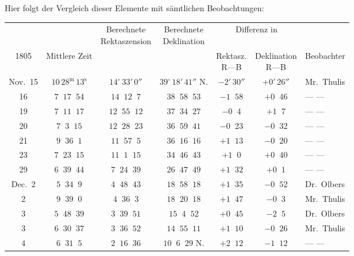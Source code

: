 \par\indent Hier folgt der Vergleich dieser Elemente mit sämtlichen Beobachtungen:



\begin{center}\begingroup
\fontsize{8}{10}\selectfont
\setlength{\tabcolsep}{2pt}\renewcommand{\arraystretch}{1.12}
\begin{tabular}{|c|c|c|c|c|c|l|}
\hline
& & \shortstack{Berechnete\\Rektaszension} & \shortstack{Berechnete\\Deklination} & \multicolumn{2}{c|}{Differenz in} & \\
1805 & Mittlere Zeit & & & \shortstack{Rektasz.\\R---B} & \shortstack{Deklination\\R---B} & Beobachter \\
\hline
Nov.\ 15 & $10\,28^{\mathrm{m}}\,13^{\mathrm{s}}$ & $14^{\circ}\,33'\,0''$ & $39^{\circ}\,18'\,41''$ N. & $-2'\,30''$ & $+0'\,26''$ & Mr.\ Thulis \\
16 & $7\;\;17\;\;54$ & $14\;\;12\;\;7$ & $38\;\;58\;\;53$ & $-1\;\;58$ & $+0\;\;46$ & --- --- \\
19 & $7\;\;11\;\;17$ & $12\;\;55\;\;12$ & $37\;\;34\;\;27$ & $-0\;\;4$ & $+1\;\;7$ & --- --- \\
20 & $7\;\;3\;\;15$ & $12\;\;28\;\;23$ & $36\;\;59\;\;41$ & $-0\;\;23$ & $-0\;\;32$ & --- --- \\
21 & $9\;\;36\;\;1$ & $11\;\;57\;\;5$ & $36\;\;16\;\;16$ & $+1\;\;13$ & $-0\;\;20$ & --- --- \\
23 & $7\;\;23\;\;15$ & $11\;\;1\;\;15$ & $34\;\;46\;\;43$ & $+1\;\;0$ & $+0\;\;40$ & --- --- \\
29 & $6\;\;39\;\;44$ & $7\;\;24\;\;39$ & $26\;\;47\;\;49$ & $+1\;\;32$ & $+0\;\;1$ & --- --- \\
Dec.\ 2 & $5\;\;34\;\;9$ & $4\;\;48\;\;43$ & $18\;\;58\;\;18$ & $+1\;\;35$ & $-0\;\;52$ & Dr.\ Olbers \\
2 & $9\;\;39\;\;0$ & $4\;\;36\;\;3$ & $18\;\;20\;\;18$ & $+1\;\;47$ & $-0\;\;3$ & Mr.\ Thulis \\
3 & $5\;\;48\;\;39$ & $3\;\;39\;\;51$ & $15\;\;4\;\;52$ & $+0\;\;45$ & $-2\;\;5$ & Dr.\ Olbers \\
3 & $6\;\;30\;\;37$ & $3\;\;36\;\;52$ & $14\;\;55\;\;11$ & $+1\;\;10$ & $-0\;\;26$ & Mr.\ Thulis \\
4 & $6\;\;31\;\;5$ & $2\;\;16\;\;36$ & $10\;\;6\;\;29$ N. & $+2\;\;12$ & $-1\;\;12$ & --- --- \\

\end{tabular}
\end{center}
